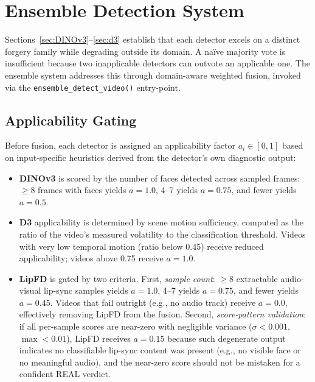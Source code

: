 \documentclass[conference]{IEEEtran}
\begin{document}

\section{Ensemble Detection System} \label{sec:ensemble}

Sections~\ref{sec:DINOv3}--\ref{sec:d3} establish that each detector excels on a distinct forgery family while degrading outside its domain. A na\"ive majority vote is insufficient because two inapplicable detectors can outvote an applicable one. The ensemble system addresses this through domain-aware weighted fusion, invoked via the \texttt{ensemble\_detect\_video()} entry-point.

\subsection{Applicability Gating}
Before fusion, each detector is assigned an applicability factor $a_i \in [0, 1]$ based on input-specific heuristics derived from the detector's own diagnostic output:

\begin{itemize}[leftmargin=*]
    \item \textbf{DINOv3} is scored by the number of faces detected across sampled frames: $\geq$8 frames with faces yields $a = 1.0$, 4--7 yields $a = 0.75$, and fewer yields $a = 0.5$.
    \item \textbf{D3} applicability is determined by scene motion sufficiency, computed as the ratio of the video's measured volatility to the classification threshold. Videos with very low temporal motion (ratio below 0.45) receive reduced applicability; videos above 0.75 receive $a = 1.0$.
    \item \textbf{LipFD} is gated by two criteria.  First, \emph{sample count}: $\geq$8 extractable audio-visual lip-sync samples yields $a = 1.0$, 4--7 yields $a = 0.75$, and fewer yields $a = 0.45$.  Videos that fail outright (e.g., no audio track) receive $a = 0.0$, effectively removing LipFD from the fusion.  Second, \emph{score-pattern validation}: if all per-sample scores are near-zero with negligible variance ($\sigma < 0.001$, $\max < 0.01$), LipFD receives $a = 0.15$ because such degenerate output indicates no classifiable lip-sync content was present (e.g., no visible face or no meaningful audio), and the near-zero score should not be mistaken for a confident REAL verdict.
\end{itemize}
\end{document}
